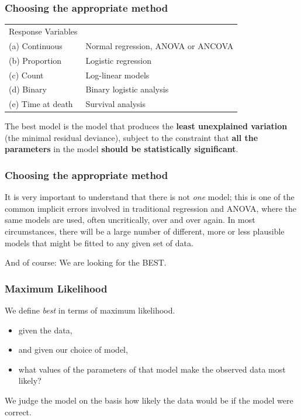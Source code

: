 \documentclass[xcolor={table},handout]{beamer}
\begin{document}
\begin{frame}\frametitle{Choosing the appropriate method}
\begin{center}
  \begin{tabular}{@{} >{\ttfamily}l l} 
    \rowcolor{gray!40}
Response Variables & \\
(a) Continuous   & Normal regression, ANOVA or ANCOVA\\
(b) Proportion   & Logistic regression               \\
(c) Count        & Log-linear models                 \\
(d) Binary       & Binary logistic analysis          \\
(e) Time at death& Survival analysis                 \\
  \end{tabular}
\end{center}
The best model is the model that produces the \textbf{least unexplained variation} (the minimal residual
deviance), subject to the constraint that \textbf{all the parameters} in the model \textbf{should be statistically
significant}.
\end{frame}

\begin{frame}\frametitle{Choosing the appropriate method}
It is very important to understand that there is not \textit{one} model; this is one of the common implicit errors involved in traditional regression and ANOVA, where the same models are used, often uncritically, over and over again. In most
circumstances, there will be a large number of different, more or less plausible models that
might be fitted to any given set of data. 

And of course: We are looking for the BEST.
\end{frame}

\begin{frame}\frametitle{Maximum Likelihood}
We define \emph{best} in terms of maximum likelihood.
\begin{itemize}
\item given the data,                                                                
\item and given our choice of model,                                                 
\item what values of the parameters of that model make the observed data most likely?
\end{itemize}
We judge the model on the basis how likely the data would be if the model were correct. 
\end{frame}
\end{document}
